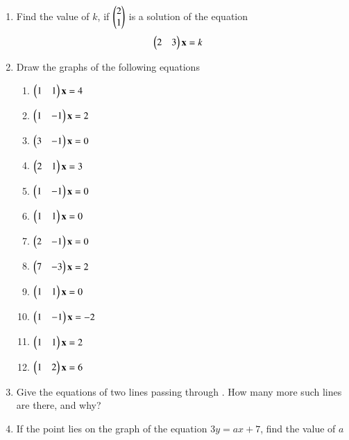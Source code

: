 \begin{enumerate}[label=\arabic*.,ref=\thesubsection.\theenumi]
%
%
\begin{enumerate}[itemsep=2pt]
\end{enumerate}
%
\item Find the value of $k$, if $\begin{pmatrix}2\\1\end{pmatrix}$ is a solution of the equation 
%
%
\begin{align}
\begin{pmatrix}2 & 3\end{pmatrix}\mathbf{x} &= k
\end{align}
%
%
\item Draw the graphs of the following equations
\begin{enumerate}[itemsep=2pt]
\item $\begin{pmatrix}1 & 1\end{pmatrix}\mathbf{x} = 4$
\item $\begin{pmatrix} 1 & -1\end{pmatrix}\mathbf{x}  = 2 $
\item $\begin{pmatrix} 3 & -1\end{pmatrix}\mathbf{x}  = 0$
\item $\begin{pmatrix} 2 & 1\end{pmatrix}\mathbf{x}  = 3$
\item $\begin{pmatrix} 1 & -1\end{pmatrix}\mathbf{x}  = 0$
\item $\begin{pmatrix} 1& 1\end{pmatrix}\mathbf{x}  = 0$
\item $\begin{pmatrix} 2& -1\end{pmatrix}\mathbf{x}  = 0$
\item $\begin{pmatrix} 7& -3\end{pmatrix}\mathbf{x}  = 2$
\item $\begin{pmatrix} 1& 1\end{pmatrix}\mathbf{x}  = 0$
\item $\begin{pmatrix} 1& -1\end{pmatrix}\mathbf{x}  = -2$
\item $\begin{pmatrix} 1& 1\end{pmatrix}\mathbf{x}  = 2$
\item $\begin{pmatrix} 1& 2\end{pmatrix}\mathbf{x}  = 6$
\end{enumerate}
%
\item Give the equations of two lines passing through . How many more such lines are there, and why?
\item If the point  lies on the graph of the equation $3y = ax + 7$, find the value of $a$

\end{enumerate}
